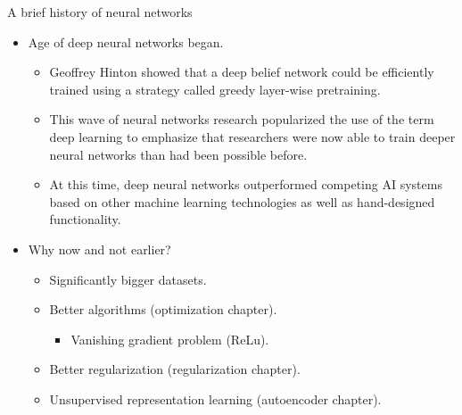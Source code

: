\begin{vbframe}{A brief history of neural networks}
\begin{itemize}
    \begin{itemize}
      \item Overly optimistic/exaggerated expectations concerning potential of AI/DL.
      \item Angering investors, the phrase \enquote{AI} even reached a pseudoscience status.
      \item Kernel machines and graphical models both achieved good results on many important tasks.
      \item Some of the fundamental mathematical difficulties in modeling long sequences were identified.
    \end{itemize}
    \item {} Age of deep neural networks began.
    \begin{itemize}
      \item Geoffrey Hinton showed that a deep belief network could be efficiently trained using a strategy called greedy layer-wise pretraining.
      \item This wave of neural networks research popularized the use of the term deep learning to emphasize that researchers were now able to train deeper neural networks than had been possible before.
      \item At this time, deep neural networks outperformed competing AI systems based on other machine learning technologies as well as hand-designed functionality.
    \end{itemize}
\framebreak
      \item  Why now and not earlier?
      \begin{itemize}
    \vspace{2mm}
    \item Significantly bigger datasets.
    \vspace{2mm}
    \item Better algorithms (optimization chapter).
      \begin{itemize}
        \item Vanishing gradient problem (ReLu).
      \end{itemize}
      \vspace{2mm}
    \item Better regularization (regularization chapter).
    \vspace{2mm}
    \item Unsupervised representation learning (autoencoder chapter).

\end{itemize}
\end{itemize}
\end{vbframe}
